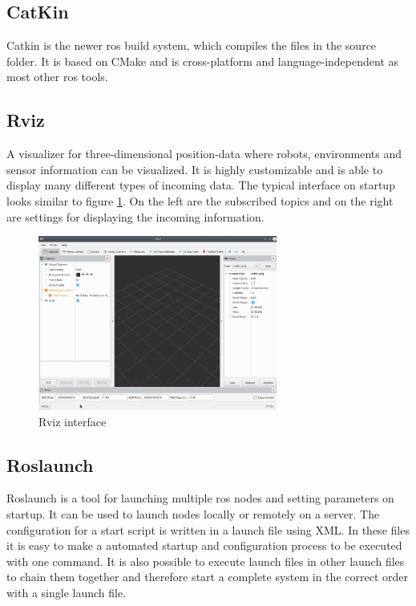 \subsection{CatKin}\label{catkin}
Catkin is the newer \gls{ros} build system, which compiles the files in the source folder. It is based on CMake and is cross-platform and language-independent as most other \gls{ros} tools.

\subsection{Rviz}\label{rviz}
A visualizer for three-dimensional position-data where robots, environments and sensor information can be visualized. It is highly customizable and is able to display many different types of incoming data. The typical interface on startup looks similar to figure \ref{rvizinterface}. On the left are the subscribed topics and on the right are settings for displaying the incoming information. \newline
\begin{figure}[h]
	\centering
	\includegraphics[width=0.7\textwidth]{./media/images/rviz}
  	\caption{Rviz interface}
  	\label{rvizinterface}
\end{figure}

\subsection{Roslaunch}\label{roslaunch}
Roslaunch is a tool for launching multiple \gls{ros} nodes and setting parameters on startup. It can be used to launch nodes locally or remotely on a server.
The configuration for a start script is written in a launch file using XML. In these files it is easy to make a automated startup and configuration process to be executed with one command. It is also possible to execute launch files in other launch files to chain them together and therefore start a complete system in the correct order with a single launch file.